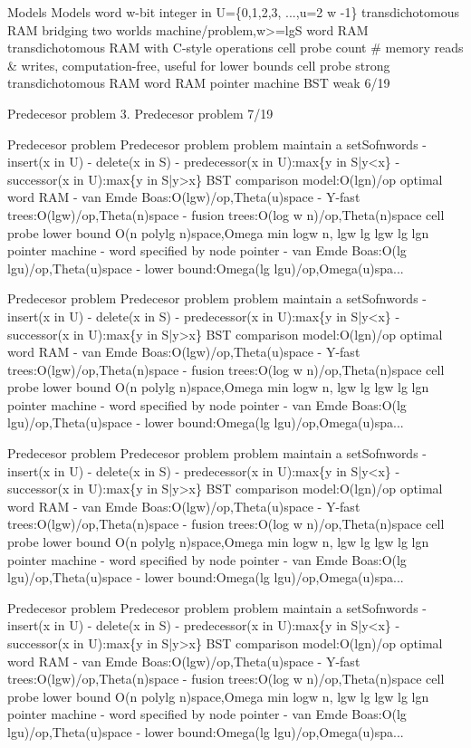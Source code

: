 \begin{description}[leftmargin=!,labelwidth=4.2em,style=nextline]
\item[Pag. 11] Models Models word w-bit integer in U=\{0,1,2,3, ...,u=2 w -1\} transdichotomous RAM bridging two worlds machine/problem,w>=lgS word RAM transdichotomous RAM with C-style operations cell probe count \# memory reads \& writes, computation-free, useful for lower bounds cell probe strong transdichotomous RAM word RAM pointer machine BST weak 6/19
\item[Pag. 12] Predecesor problem 3. Predecesor problem 7/19
\item[Pag. 13] Predecesor problem Predecesor problem problem maintain a setSofnwords - insert(x in U) - delete(x in S) - predecessor(x in U):max\{y in S|y<x\} - successor(x in U):max\{y in S|y>x\} BST comparison model:O(lgn)/op optimal word RAM - van Emde Boas:O(lgw)/op,Theta(u)space - Y-fast trees:O(lgw)/op,Theta(n)space - fusion trees:O(log w n)/op,Theta(n)space cell probe lower bound O(n polylg n)space,Omega min logw n, lgw lg lgw lg lgn pointer machine - word specified by node pointer - van Emde Boas:O(lg lgu)/op,Theta(u)space - lower bound:Omega(lg lgu)/op,Omega(u)spa...
\item[Pag. 14] Predecesor problem Predecesor problem problem maintain a setSofnwords - insert(x in U) - delete(x in S) - predecessor(x in U):max\{y in S|y<x\} - successor(x in U):max\{y in S|y>x\} BST comparison model:O(lgn)/op optimal word RAM - van Emde Boas:O(lgw)/op,Theta(u)space - Y-fast trees:O(lgw)/op,Theta(n)space - fusion trees:O(log w n)/op,Theta(n)space cell probe lower bound O(n polylg n)space,Omega min logw n, lgw lg lgw lg lgn pointer machine - word specified by node pointer - van Emde Boas:O(lg lgu)/op,Theta(u)space - lower bound:Omega(lg lgu)/op,Omega(u)spa...
\item[Pag. 15] Predecesor problem Predecesor problem problem maintain a setSofnwords - insert(x in U) - delete(x in S) - predecessor(x in U):max\{y in S|y<x\} - successor(x in U):max\{y in S|y>x\} BST comparison model:O(lgn)/op optimal word RAM - van Emde Boas:O(lgw)/op,Theta(u)space - Y-fast trees:O(lgw)/op,Theta(n)space - fusion trees:O(log w n)/op,Theta(n)space cell probe lower bound O(n polylg n)space,Omega min logw n, lgw lg lgw lg lgn pointer machine - word specified by node pointer - van Emde Boas:O(lg lgu)/op,Theta(u)space - lower bound:Omega(lg lgu)/op,Omega(u)spa...
\item[Pag. 16] Predecesor problem Predecesor problem problem maintain a setSofnwords - insert(x in U) - delete(x in S) - predecessor(x in U):max\{y in S|y<x\} - successor(x in U):max\{y in S|y>x\} BST comparison model:O(lgn)/op optimal word RAM - van Emde Boas:O(lgw)/op,Theta(u)space - Y-fast trees:O(lgw)/op,Theta(n)space - fusion trees:O(log w n)/op,Theta(n)space cell probe lower bound O(n polylg n)space,Omega min logw n, lgw lg lgw lg lgn pointer machine - word specified by node pointer - van Emde Boas:O(lg lgu)/op,Theta(u)space - lower bound:Omega(lg lgu)/op,Omega(u)spa...

\end{description}
